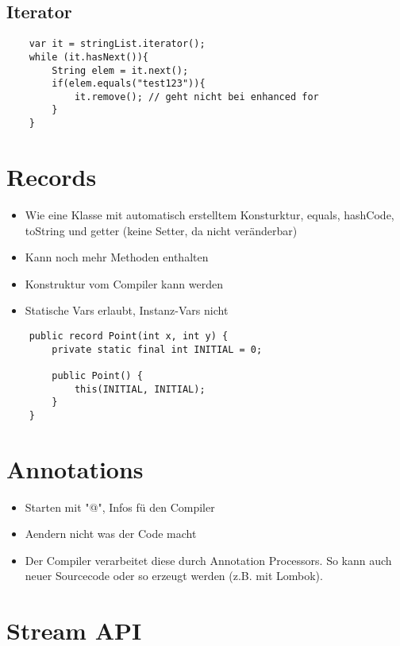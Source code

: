 \begin{multicols*}{5}
	\subsection{Iterator}
	\begin{lstlisting}
	var it = stringList.iterator();
	while (it.hasNext()){
		String elem = it.next();
		if(elem.equals("test123")){
			it.remove(); // geht nicht bei enhanced for
		}
	}
	\end{lstlisting}

\section{Records}
	\begin{itemize}
		\item Wie eine Klasse mit automatisch erstelltem Konsturktur, equals, hashCode, toString und getter (keine Setter, da nicht veränderbar)
		\item Kann noch mehr Methoden enthalten
		\item Konstruktur vom Compiler kann werden
		\item Statische Vars erlaubt, Instanz-Vars nicht
	\end{itemize}
	\begin{lstlisting}
	public record Point(int x, int y) {
		private static final int INITIAL = 0;
		
		public Point() {
			this(INITIAL, INITIAL);
		}
	}
	\end{lstlisting}

\section{Annotations}
	\begin{itemize}
	\item Starten mit "@", Infos fü den Compiler
	\item Aendern nicht was der Code macht
	\item Der Compiler verarbeitet diese durch Annotation Processors. So kann auch neuer Sourcecode oder so erzeugt werden (z.B. mit Lombok).
\end{itemize}

\section{Stream API}

\end{multicols*}
